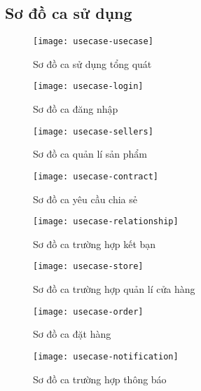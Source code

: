 \subsection{Sơ đồ ca sử dụng}

\begin{figure}[hbt!]
	\centering
	\texttt{[image: usecase-usecase]}
	\caption{Sơ đồ ca sử dụng tổng quát}
\end{figure}
\clearpage
\begin{figure}[hbt!]
	\begin{center}	
		\texttt{[image: usecase-login]}
		\caption{Sơ đồ ca đăng nhập}
	\end{center}
\end{figure}


\begin{figure}[hbt!]
	\begin{center}	
		\texttt{[image: usecase-sellers]}
		\caption{Sơ đồ ca quản lí sản phẩm}
	\end{center}
\end{figure}


\begin{figure}[hbt!]
	\begin{center}	
		\texttt{[image: usecase-contract]}
		\caption{Sơ đồ ca yêu cầu chia sẻ}
	\end{center}
\end{figure}


\begin{figure}[hbt!]
	\begin{center}	
		\texttt{[image: usecase-relationship]}
		\caption{Sơ đồ ca trường hợp kết bạn}
	\end{center}
\end{figure}



\begin{figure}[hbt!]
	\begin{center}	
		\texttt{[image: usecase-store]}
		\caption{Sơ đồ ca trường hợp quản lí cửa hàng}
	\end{center}
\end{figure}

\begin{figure}[hbt!]
	\begin{center}	
		\texttt{[image: usecase-order]}
		\caption{Sơ đồ ca đặt hàng}
	\end{center}
\end{figure}


\begin{figure}[hbt!]
	\begin{center}	
		\texttt{[image: usecase-notification]}
		\caption{Sơ đồ ca trường hợp thông báo}
	\end{center}
\end{figure}